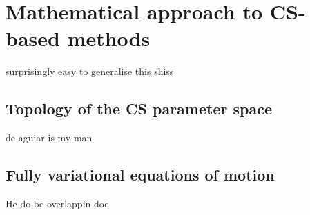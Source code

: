 \section{Mathematical approach to CS-based methods}
surprisingly easy to generalise this shiss
	
\subsection{Topology of the CS parameter space}
de aguiar is my man
	
\subsection{Fully variational equations of motion}
He do be overlappin doe
